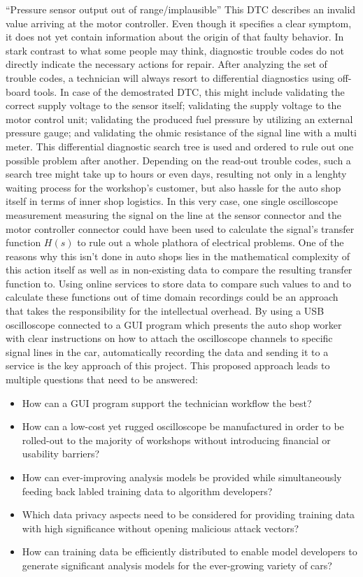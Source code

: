 ``Pressure sensor output out of range/implausible'' This DTC describes an invalid value arriving at the motor controller.
Even though it specifies a clear symptom, it does not yet contain information about the origin of that faulty behavior.
In stark contrast to what some people may think, diagnostic trouble codes do not directly indicate the necessary actions for repair.
After analyzing the set of trouble codes, a technician will always resort to differential diagnostics using off-board tools.
In case of the demostrated DTC, this might include validating the correct supply voltage to the sensor itself; 
validating the supply voltage to the motor control unit; validating the produced fuel pressure by utilizing an external pressure gauge; and validating the ohmic resistance of the signal line with a multi meter.
This differential diagnostic search tree is used and ordered to rule out one possible problem after another.
Depending on the read-out trouble codes, such a search tree might take up to hours or even days, resulting not only in a lenghty waiting process for the workshop's customer, but also hassle for the auto shop itself in terms of inner shop logistics.
In this very case, one single oscilloscope measurement measuring the signal on the line at the sensor connector and the motor controller connector could have been used to calculate the signal's transfer function $H(s)$ to rule out a whole plathora of electrical problems.
One of the reasons why this isn't done in auto shops lies in the mathematical complexity of this action itself as well as in non-existing data to compare the resulting transfer function to.
Using online services to store data to compare such values to and to calculate these functions out of time domain recordings could be an approach that takes the responsibility for the intellectual overhead.
By using a USB oscilloscope connected to a GUI program which presents the auto shop worker with clear instructions on how to attach the oscilloscope channels to specific signal lines in the car, automatically recording the data and sending it to a service is the key approach of this project. 
This proposed approach leads to multiple questions that need to be answered:
\begin{itemize}
  \item How can a GUI program support the technician workflow the best?
  \item How can a low-cost yet rugged oscilloscope be manufactured in order to be rolled-out to the majority of workshops without introducing financial or usability barriers?
  \item How can ever-improving analysis models be provided while simultaneously feeding back labled training data to algorithm developers?
  \item Which data privacy aspects need to be considered for providing training data with high significance without opening malicious attack vectors?
  \item How can training data be efficiently distributed to enable model developers to generate significant analysis models for the ever-growing variety of cars?
\end{itemize}

